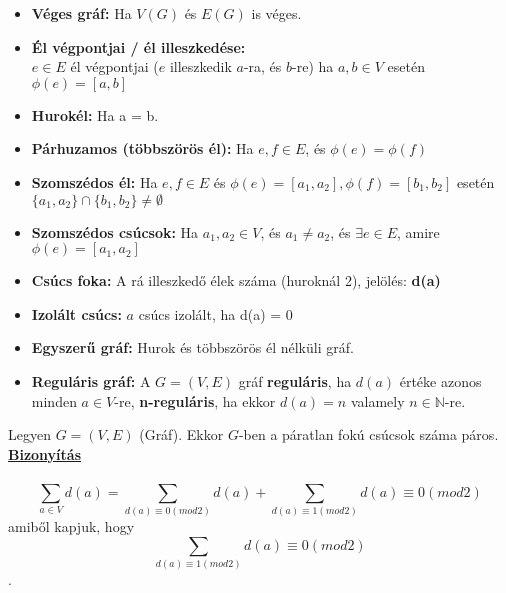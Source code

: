 \begin{frame}

\begin{tcolorbox}[title={Egyéb definíciók}]
\begin{itemize}
\item \textbf{Véges gráf:} Ha $V(G)$ és $E(G)$ is véges.
\item \textbf{Él végpontjai / él illeszkedése:}\\
$e \in E$ él végpontjai ($e$ illeszkedik $a$-ra, és $b$-re) ha $a, b \in V$ esetén ${\phi}(e) = [a, b]$
\item \textbf{Hurokél:} Ha a = b.
\item \textbf{Párhuzamos (többszörös él):} Ha $e, f \in E$, és ${\phi}(e) = {\phi}(f)$
\item \textbf{Szomszédos él:} Ha $e, f \in E$ és ${\phi}(e) = [a_1, a_2], {\phi}(f) = [b_1, b_2]$ esetén $\{a_1, a_2\} \cap \{b_1, b_2\} \neq \emptyset$
\item \textbf{Szomszédos csúcsok:} Ha $a_1, a_2 \in V$, és $a_1 \neq a_2$, és ${\exists}e \in E$, amire ${\phi}(e) = [a_1, a_2]$
\item \textbf{Csúcs foka:} A rá illeszkedő élek száma (huroknál 2), jelölés: \textbf{d(a)}
\item \textbf{Izolált csúcs:} $a$ csúcs izolált, ha d(a) = 0
\item \textbf{Egyszerű gráf:} Hurok és többszörös él nélküli gráf.
\item \textbf{Reguláris gráf:} A $G = (V, E)$ gráf \textbf{reguláris}, ha $d(a)$ értéke azonos minden $a \in V$-re, \textbf{n-reguláris}, ha ekkor $d(a) = n$ valamely $n \in \mathbb{N}$-re.
\end{itemize}
\end{tcolorbox}

\end{frame}

\begin{frame}

\begin{tcolorbox}[title={Tétel: Fokszám-Élszám}]
Legyen $G = (V, E)$ (Gráf). Ekkor $G$-ben a páratlan fokú csúcsok száma páros.\\
\tcblower
\msmallskip
\underline{\textbf{Bizonyítás}}\\
\mmedskip
\\
$$\sum_{a \in V} d(a) = \sum_{d(a) \equiv 0 (mod 2)} d(a) + \sum_{d(a) \equiv 1 (mod 2)} d(a) \equiv 0 (mod 2)$$
amiből kapjuk, hogy $$\sum_{d(a) \equiv 1 (mod 2)} d(a) \equiv 0 (mod 2)$$.

\end{tcolorbox}

\end{frame}


